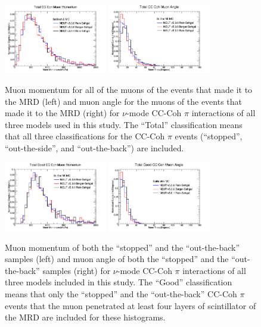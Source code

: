 \documentclass[11pt]{article}
\begin{document}
\begin{figure}[H]
\centering
\includegraphics[width=0.4\textwidth]{CCCohPlots/NMCCCohTotalMomentum.png}
\includegraphics[width=0.4\textwidth]{CCCohPlots/NMCCCohTotalAngle.png}
\caption{Muon momentum for all of the muons of the events that made it to the MRD (left) and muon angle for the muons of the events that made it to the MRD (right) for $\nu$-mode CC-Coh $\pi$ interactions of all three models used in this study. The ``Total'' classification means that all three classifications for the CC-Coh $\pi$ events (``stopped'', ``out-the-side'', and ``out-the-back'') are included.}
\label{fig:NuModeCCCohTotalMomAndAng}
\end{figure}


\begin{figure}[H]
\centering
\includegraphics[width=0.4\textwidth]{CCCohPlots/NMCCCohGoodMomentum.png}
\includegraphics[width=0.4\textwidth]{CCCohPlots/NMCCCohGoodAngle.png}
\caption{Muon momentum of both the ``stopped'' and the ``out-the-back'' samples (left) and muon angle of both the ``stopped'' and the ``out-the-back'' samples (right) for $\nu$-mode CC-Coh $\pi$ interactions of all three models included in this study. The ``Good'' classification means that only the ``stopped'' and the ``out-the-back'' CC-Coh $\pi$ events that the muon penetrated at least four layers of scintillator of the MRD are included for these histograms.}
\label{fig:NuModeCCCohGoodMomAndAng}
\end{figure}
\end{document}
